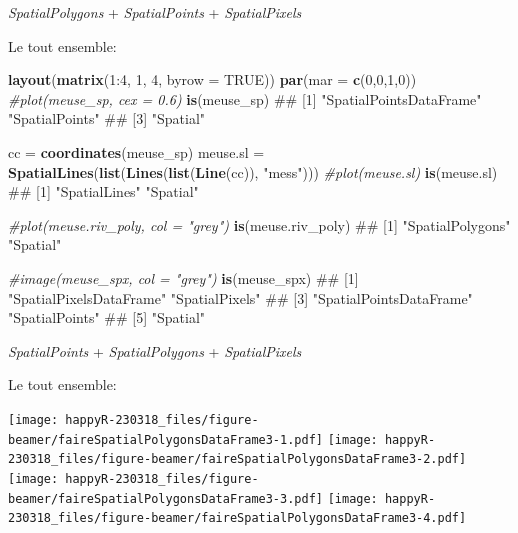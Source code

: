 \documentclass[8pt,ignorenonframetext,]{beamer}
\newenvironment{Shaded}{\begin{snugshade}}{\end{snugshade}}
\newcommand{\KeywordTok}[1]{\textcolor[rgb]{0.13,0.29,0.53}{\textbf{{#1}}}}
\newcommand{\DataTypeTok}[1]{\textcolor[rgb]{0.13,0.29,0.53}{{#1}}}
\newcommand{\DecValTok}[1]{\textcolor[rgb]{0.00,0.00,0.81}{{#1}}}
\newcommand{\StringTok}[1]{\textcolor[rgb]{0.31,0.60,0.02}{{#1}}}
\newcommand{\CommentTok}[1]{\textcolor[rgb]{0.56,0.35,0.01}{\textit{{#1}}}}
\newcommand{\OtherTok}[1]{\textcolor[rgb]{0.56,0.35,0.01}{{#1}}}
\newcommand{\NormalTok}[1]{{#1}}
\begin{document}
\begin{frame}[fragile]{\emph{SpatialPolygons} + \emph{SpatialPoints} +
\emph{SpatialPixels}}

Le tout ensemble:

\begin{Shaded}
\begin{Highlighting}[]

\KeywordTok{layout}\NormalTok{(}\KeywordTok{matrix}\NormalTok{(}\DecValTok{1}\NormalTok{:}\DecValTok{4}\NormalTok{, }\DecValTok{1}\NormalTok{, }\DecValTok{4}\NormalTok{, }\DataTypeTok{byrow =} \OtherTok{TRUE}\NormalTok{))}
\KeywordTok{par}\NormalTok{(}\DataTypeTok{mar =} \KeywordTok{c}\NormalTok{(}\DecValTok{0}\NormalTok{,}\DecValTok{0}\NormalTok{,}\DecValTok{1}\NormalTok{,}\DecValTok{0}\NormalTok{))}
\CommentTok{#plot(meuse_sp, cex = 0.6)}
\KeywordTok{is}\NormalTok{(meuse_sp)}
\NormalTok{## [1] "SpatialPointsDataFrame" "SpatialPoints"         }
\NormalTok{## [3] "Spatial"}

\NormalTok{cc =}\StringTok{ }\KeywordTok{coordinates}\NormalTok{(meuse_sp)}
\NormalTok{meuse.sl =}\StringTok{ }\KeywordTok{SpatialLines}\NormalTok{(}\KeywordTok{list}\NormalTok{(}\KeywordTok{Lines}\NormalTok{(}\KeywordTok{list}\NormalTok{(}\KeywordTok{Line}\NormalTok{(cc)), }\StringTok{"mess"}\NormalTok{)))}
\CommentTok{#plot(meuse.sl)}
\KeywordTok{is}\NormalTok{(meuse.sl)}
\NormalTok{## [1] "SpatialLines" "Spatial"}

\CommentTok{#plot(meuse.riv_poly, col = "grey")}
\KeywordTok{is}\NormalTok{(meuse.riv_poly)}
\NormalTok{## [1] "SpatialPolygons" "Spatial"}

\CommentTok{#image(meuse_spx, col = "grey")}
\KeywordTok{is}\NormalTok{(meuse_spx)}
\NormalTok{## [1] "SpatialPixelsDataFrame" "SpatialPixels"         }
\NormalTok{## [3] "SpatialPointsDataFrame" "SpatialPoints"         }
\NormalTok{## [5] "Spatial"}
\end{Highlighting}
\end{Shaded}

\end{frame}

\begin{frame}{\emph{SpatialPoints} + \emph{SpatialPolygons} +
\emph{SpatialPixels}}

Le tout ensemble:

\texttt{[image: happyR-230318\_files/figure-beamer/faireSpatialPolygonsDataFrame3-1.pdf]}
\texttt{[image: happyR-230318\_files/figure-beamer/faireSpatialPolygonsDataFrame3-2.pdf]}
\texttt{[image: happyR-230318\_files/figure-beamer/faireSpatialPolygonsDataFrame3-3.pdf]}
\texttt{[image: happyR-230318\_files/figure-beamer/faireSpatialPolygonsDataFrame3-4.pdf]}

\end{frame}
\end{document}
